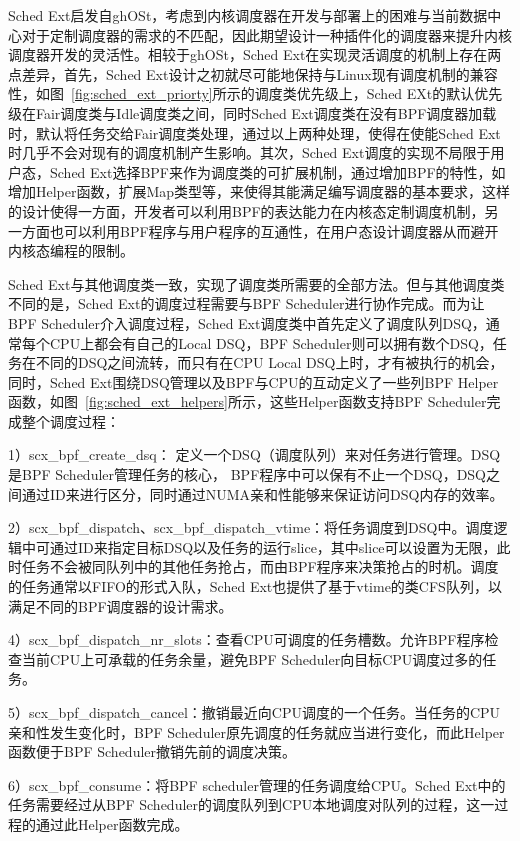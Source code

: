 Sched Ext启发自ghOSt\citep{humphries2021ghost}，考虑到内核调度器在开发与部署上的困难与当前数据中心对于定制调度器的需求的不匹配，因此期望设计一种插件化的调度器来提升内核调度器开发的灵活性。相较于ghOSt，Sched Ext在实现灵活调度的机制上存在两点差异，首先，Sched Ext设计之初就尽可能地保持与Linux现有调度机制的兼容性，如图~\ref{fig:sched_ext_priorty}所示的调度类优先级上，Sched EXt的默认优先级在Fair调度类与Idle调度类之间，同时Sched Ext调度类在没有BPF调度器加载时，默认将任务交给Fair调度类处理，通过以上两种处理，使得在使能Sched Ext时几乎不会对现有的调度机制产生影响。其次，Sched Ext调度的实现不局限于用户态，Sched Ext选择BPF来作为调度类的可扩展机制，通过增加BPF的特性，如增加Helper函数，扩展Map类型等，来使得其能满足编写调度器的基本要求，这样的设计使得一方面，开发者可以利用BPF的表达能力在内核态定制调度机制，另一方面也可以利用BPF程序与用户程序的互通性，在用户态设计调度器从而避开内核态编程的限制。

Sched Ext与其他调度类一致，实现了调度类所需要的全部方法。但与其他调度类不同的是，Sched Ext的调度过程需要与BPF Scheduler进行协作完成。而为让BPF Scheduler介入调度过程，Sched Ext调度类中首先定义了调度队列DSQ，通常每个CPU上都会有自己的Local DSQ，BPF Scheduler则可以拥有数个DSQ，任务在不同的DSQ之间流转，而只有在CPU Local DSQ上时，才有被执行的机会，同时，Sched Ext围绕DSQ管理以及BPF与CPU的互动定义了一些列BPF Helper函数，如图~\ref{fig:sched_ext_helpers}所示，这些Helper函数支持BPF Scheduler完成整个调度过程：

1）scx\_bpf\_create\_dsq： 定义一个DSQ（调度队列）来对任务进行管理。DSQ是BPF Scheduler管理任务的核心， BPF程序中可以保有不止一个DSQ，DSQ之间通过ID来进行区分，同时通过NUMA亲和性能够来保证访问DSQ内存的效率。

2）scx\_bpf\_dispatch、scx\_bpf\_dispatch\_vtime：将任务调度到DSQ中。调度逻辑中可通过ID来指定目标DSQ以及任务的运行slice，其中slice可以设置为无限，此时任务不会被同队列中的其他任务抢占，而由BPF程序来决策抢占的时机。调度的任务通常以FIFO的形式入队，Sched Ext也提供了基于vtime的类CFS队列，以满足不同的BPF调度器的设计需求。

4）scx\_bpf\_dispatch\_nr\_slots：查看CPU可调度的任务槽数。允许BPF程序检查当前CPU上可承载的任务余量，避免BPF Scheduler向目标CPU调度过多的任务。

5）scx\_bpf\_dispatch\_cancel：撤销最近向CPU调度的一个任务。当任务的CPU亲和性发生变化时，BPF Scheduler原先调度的任务就应当进行变化，而此Helper函数便于BPF Scheduler撤销先前的调度决策。

6）scx\_bpf\_consume：将BPF scheduler管理的任务调度给CPU。Sched Ext中的任务需要经过从BPF Scheduler的调度队列到CPU本地调度对队列的过程，这一过程的通过此Helper函数完成。

